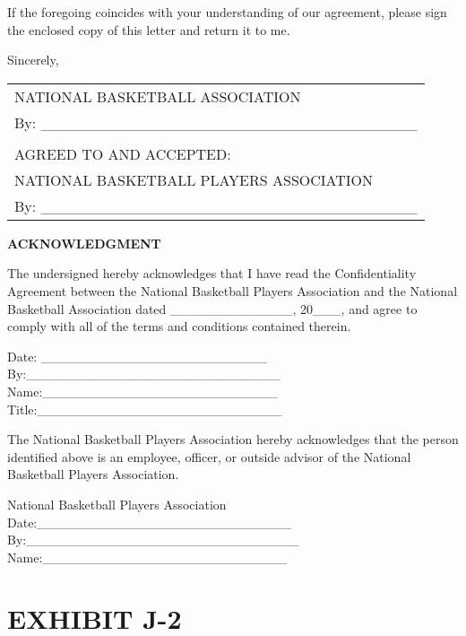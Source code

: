 \documentclass[
]{book}
\begin{document}
If the foregoing coincides with your understanding of our agreement, please sign the enclosed copy of this letter and return it to me.

Sincerely,

\begin{longtable}[]{@{}l@{}}
\toprule()
\endhead
NATIONAL BASKETBALL ASSOCIATION \\
By: \_\_\_\_\_\_\_\_\_\_\_\_\_\_\_\_\_\_\_\_\_\_\_\_\_\_\_\_\_\_\_\_\_\_\_ \\
 \\
AGREED TO AND ACCEPTED: \\
NATIONAL BASKETBALL PLAYERS ASSOCIATION \\
By: \_\_\_\_\_\_\_\_\_\_\_\_\_\_\_\_\_\_\_\_\_\_\_\_\_\_\_\_\_\_\_\_\_\_\_ \\
\bottomrule()
\end{longtable}

\newpage

\textbf{ACKNOWLEDGMENT}

The undersigned hereby acknowledges that I have read the Confidentiality Agreement between the National Basketball Players Association and the National Basketball Association dated \_\_\_\_\_\_\_\_\_\_\_\_\_, 20\_\_\_, and agree to comply with all of the terms and conditions contained therein.

Date: \_\_\_\_\_\_\_\_\_\_\_\_\_\_\_\_\_\_\_\_\_\_\_\_\\
By:\_\_\_\_\_\_\_\_\_\_\_\_\_\_\_\_\_\_\_\_\_\_\_\_\_\_\_\\
Name:\_\_\_\_\_\_\_\_\_\_\_\_\_\_\_\_\_\_\_\_\_\_\_\_\_\\
Title:\_\_\_\_\_\_\_\_\_\_\_\_\_\_\_\_\_\_\_\_\_\_\_\_\_\_

The National Basketball Players Association hereby acknowledges that the person identified above is an employee, officer, or outside advisor of the National Basketball Players Association.

National Basketball Players Association\\
Date:\_\_\_\_\_\_\_\_\_\_\_\_\_\_\_\_\_\_\_\_\_\_\_\_\_\_\_\\
By:\_\_\_\_\_\_\_\_\_\_\_\_\_\_\_\_\_\_\_\_\_\_\_\_\_\_\_\_\_\\
Name:\_\_\_\_\_\_\_\_\_\_\_\_\_\_\_\_\_\_\_\_\_\_\_\_\_\_

\newpage

\hypertarget{exhibit-j-2-1}{%
\section{EXHIBIT J-2}\label{exhibit-j-2-1}}
\end{document}
